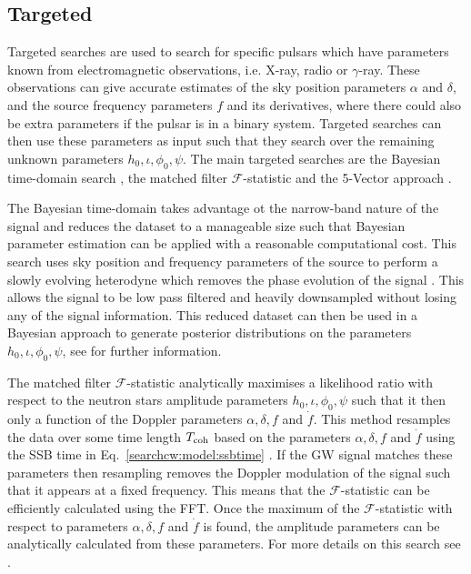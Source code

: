 \subsection{\label{searchcw:search:targeted}Targeted}

Targeted searches are used to search for specific
pulsars which have parameters known from electromagnetic observations, i.e.
X-ray, radio or $\gamma$-ray.  These observations can give accurate estimates of the sky position parameters
$\alpha$ and $\delta$, and the source frequency parameters $f$ and its
derivatives, where there could also be extra parameters if the pulsar is in a
binary system.
Targeted searches can then use these parameters as input such that they search
over the remaining unknown parameters $h_0, \iota, \phi_0, \psi$.  The
main targeted searches are the Bayesian time-domain search
\citep{dupuis2005BayesianEstimation}, the matched filter
$\mathcal{F}$-statistic \citep{schutz1998DataAnalysis} and the 5-Vector
approach \citep{astone2010MethodDetection}.

The Bayesian time-domain takes advantage ot the narrow-band nature of the signal and reduces the dataset to a manageable size such that Bayesian parameter
estimation can be applied with a reasonable computational cost.  This search
uses sky position and frequency parameters of the source to perform a slowly
evolving heterodyne which removes the phase evolution of the signal
\citep{dupuis2005BayesianEstimation}.  This allows
the signal to be low pass filtered and heavily downsampled without losing any
of the signal information.  This reduced dataset can then be used in a Bayesian
approach to generate posterior distributions on the parameters $h_0, \iota, \phi_0, \psi$, see
\citep{dupuis2005BayesianEstimation} for further information.  

The matched filter $\mathcal{F}$-statistic \citep{schutz1998DataAnalysis} analytically maximises a likelihood ratio with respect to the neutron stars amplitude parameters $h_0, \iota, \phi_0, \psi$ such that it then only a function of the Doppler parameters $\alpha, \delta, f$ and $\dot{f}$. 
This method resamples the data over some time length $T_{\rm coh}$ based on the parameters $\alpha, \delta, f$ and $\dot{f}$ using the \gls{SSB} time in Eq.~\ref{searchcw:model:ssbtime} \citep{schutz1998DataAnalysis}.
If the \gls{GW} signal matches these parameters then resampling removes the Doppler modulation of the signal such that it appears at a fixed frequency.
This means that the $\mathcal{F}$-statistic can be efficiently calculated using the \gls{FFT}. 
Once the maximum of the $\mathcal{F}$-statistic with respect to parameters $\alpha, \delta, f$ and $\dot{f}$  is found, the amplitude parameters can be analytically calculated from these parameters.
For more details on this search see \citep{schutz1998DataAnalysis,brady2000SearchingPeriodic,prix2007SearchContinuous,
aasi2014GRAVITATIONALWAVES}.

